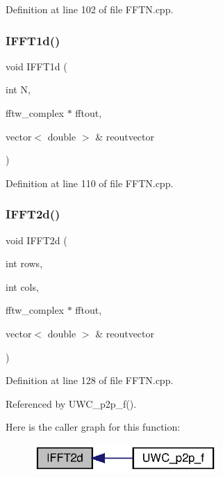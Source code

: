 Definition at line 102 of file F\+F\+T\+N.\+cpp.

\mbox{\label{FFTN_8h_a5e3546bd07d42d7e170723bc123237d4_a5e3546bd07d42d7e170723bc123237d4}} 
\subsubsection{I\+F\+F\+T1d()\hspace{0.1cm}{\footnotesize\ttfamily [2/2]}}
{\footnotesize\ttfamily void I\+F\+F\+T1d (\begin{DoxyParamCaption}\item[{int}]{N,  }\item[{fftw\+\_\+complex $\ast$}]{fftout,  }\item[{vector$<$ double $>$ \&}]{reoutvector }\end{DoxyParamCaption})}



Definition at line 110 of file F\+F\+T\+N.\+cpp.

\mbox{\label{FFTN_8h_a4465313cbf2ef9d0c966c066c7e995be_a4465313cbf2ef9d0c966c066c7e995be}} 
\subsubsection{I\+F\+F\+T2d()\hspace{0.1cm}{\footnotesize\ttfamily [1/2]}}
{\footnotesize\ttfamily void I\+F\+F\+T2d (\begin{DoxyParamCaption}\item[{int}]{rows,  }\item[{int}]{cols,  }\item[{fftw\+\_\+complex $\ast$}]{fftout,  }\item[{vector$<$ double $>$ \&}]{reoutvector }\end{DoxyParamCaption})}



Definition at line 128 of file F\+F\+T\+N.\+cpp.



Referenced by U\+W\+C\+\_\+p2p\+\_\+f().

Here is the caller graph for this function\+:\nopagebreak
\begin{figure}[H]
\begin{center}
\leavevmode
\includegraphics[width=199pt]{FFTN_8h_a4465313cbf2ef9d0c966c066c7e995be_a4465313cbf2ef9d0c966c066c7e995be_icgraph}
\end{center}
\end{figure}
\mbox{\label{FFTN_8h_ab9347430acea2369a310fac89d6399d7_ab9347430acea2369a310fac89d6399d7}} 
